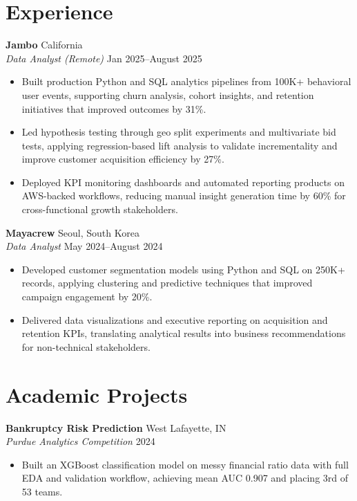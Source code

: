 \documentclass[11pt,a4paper]{article}
\begin{document}
\section*{Experience}
\noindent
\textbf{Jambo} \hfill California \\
\textit{Data Analyst (Remote)} \hfill Jan 2025--August 2025
\begin{itemize}[leftmargin=*, noitemsep, topsep=0pt]
    \item Built production Python and SQL analytics pipelines from 100K+ behavioral user events, supporting churn analysis, cohort insights, and retention initiatives that improved outcomes by 31\%.
    \item Led hypothesis testing through geo split experiments and multivariate bid tests, applying regression-based lift analysis to validate incrementality and improve customer acquisition efficiency by 27\%.
    \item Deployed KPI monitoring dashboards and automated reporting products on AWS-backed workflows, reducing manual insight generation time by 60\% for cross-functional growth stakeholders.
\end{itemize}
\vspace{6pt}

\noindent
\textbf{Mayacrew} \hfill Seoul, South Korea \\
\textit{Data Analyst} \hfill May 2024--August 2024
\begin{itemize}[leftmargin=*, noitemsep, topsep=0pt]
    \item Developed customer segmentation models using Python and SQL on 250K+ records, applying clustering and predictive techniques that improved campaign engagement by 20\%.
    \item Delivered data visualizations and executive reporting on acquisition and retention KPIs, translating analytical results into business recommendations for non-technical stakeholders.
\end{itemize}

\section*{Academic Projects}
\noindent
\textbf{Bankruptcy Risk Prediction} \hfill West Lafayette, IN \\
\textit{Purdue Analytics Competition} \hfill 2024
\begin{itemize}[leftmargin=*, noitemsep, topsep=0pt]
    \item Built an XGBoost classification model on messy financial ratio data with full EDA and validation workflow, achieving mean AUC 0.907 and placing 3rd of 53 teams.
\end{itemize}
\vspace{6pt}
\end{document}
